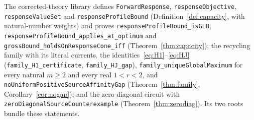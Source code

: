 \documentclass[11pt,reqno]{amsart}
\theoremstyle{plain}
\theoremstyle{definition}
\theoremstyle{remark}
\numberwithin{equation}{section}
\begin{document}
The corrected-theory library defines \texttt{ForwardResponse}, \texttt{responseObjective}, \texttt{responseValueSet} and \texttt{response\allowbreak Profile\allowbreak Bound} (Definition~\ref{def:capacity}, with natural-number weights) and proves \texttt{responseProfileBound\_\allowbreak isGLB}, \texttt{responseProfileBound\_\allowbreak applies\_\allowbreak at\_\allowbreak optimum} and \texttt{grossBound\_\allowbreak holdsOnResponseCone\_\allowbreak iff} (Theorem~\ref{thm:capacity}); the recycling family with its literal currents, the identities~\eqref{eq:H1}--\eqref{eq:HJ} (\texttt{family\_\allowbreak H1\_\allowbreak certificate}, \texttt{family\_\allowbreak HJ\_\allowbreak gap}), \texttt{family\_\allowbreak uniqueGlobalMaximum} for every natural $m\ge2$ and every real $1<r<2$, and \texttt{noUniformPositiveSourceAffinityGap} (Theorem~\ref{thm:family}, Corollary~\ref{cor:nogap}); and the zero-diagonal circuit with \texttt{zeroDiagonalSourceCounterexample} (Theorem~\ref{thm:zerodiag}).  Its two roots bundle these statements.
\end{document}
